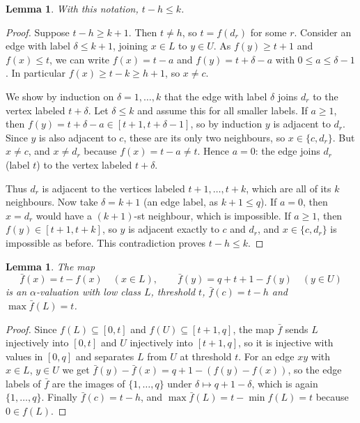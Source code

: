 \documentclass[11pt]{amsart}
\newtheorem{lemma}[theorem]{Lemma}
\theoremstyle{definition}
\theoremstyle{remark}
\begin{document}
\begin{lemma}\label{lem:key}
With this notation, $t - h \le k$.
\end{lemma}

\begin{proof}
Suppose $t - h \ge k+1$. Then $t \ne h$, so $t = f(d_r)$ for some $r$. Consider an edge with label $\delta \le k+1$, joining $x \in L$ to $y \in U$. As $f(y) \ge t+1$ and $f(x) \le t$, we can write $f(x) = t - a$ and $f(y) = t + \delta - a$ with $0 \le a \le \delta - 1$. In particular $f(x) \ge t - k \ge h + 1$, so $x \ne c$.

We show by induction on $\delta = 1, \dots, k$ that the edge with label $\delta$ joins $d_r$ to the vertex labeled $t + \delta$. Let $\delta \le k$ and assume this for all smaller labels. If $a \ge 1$, then $f(y) = t + \delta - a \in [t+1, t+\delta-1]$, so by induction $y$ is adjacent to $d_r$. Since $y$ is also adjacent to $c$, these are its only two neighbours, so $x \in \{c, d_r\}$. But $x \ne c$, and $x \ne d_r$ because $f(x) = t - a \ne t$. Hence $a = 0$: the edge joins $d_r$ (label $t$) to the vertex labeled $t + \delta$.

Thus $d_r$ is adjacent to the vertices labeled $t+1, \dots, t+k$, which are all of its $k$ neighbours. Now take $\delta = k+1$ (an edge label, as $k+1 \le q$). If $a = 0$, then $x = d_r$ would have a $(k+1)$-st neighbour, which is impossible. If $a \ge 1$, then $f(y) \in [t+1, t+k]$, so $y$ is adjacent exactly to $c$ and $d_r$, and $x \in \{c, d_r\}$ is impossible as before. This contradiction proves $t - h \le k$.
\end{proof}

\begin{lemma}\label{lem:reverse}
The map
\[
  \bar f(x) = t - f(x) \quad (x \in L), \qquad \bar f(y) = q + t + 1 - f(y) \quad (y \in U)
\]
is an $\alpha$-valuation with low class $L$, threshold $t$, $\bar f(c) = t - h$ and $\max \bar f(L) = t$.
\end{lemma}

\begin{proof}
Since $f(L) \subseteq [0,t]$ and $f(U) \subseteq [t+1, q]$, the map $\bar f$ sends $L$ injectively into $[0,t]$ and $U$ injectively into $[t+1,q]$, so it is injective with values in $[0,q]$ and separates $L$ from $U$ at threshold $t$. For an edge $xy$ with $x \in L$, $y \in U$ we get $\bar f(y) - \bar f(x) = q + 1 - (f(y) - f(x))$, so the edge labels of $\bar f$ are the images of $\{1,\dots,q\}$ under $\delta \mapsto q+1-\delta$, which is again $\{1,\dots,q\}$. Finally $\bar f(c) = t - h$, and $\max \bar f(L) = t - \min f(L) = t$ because $0 \in f(L)$.
\end{proof}
\end{document}
